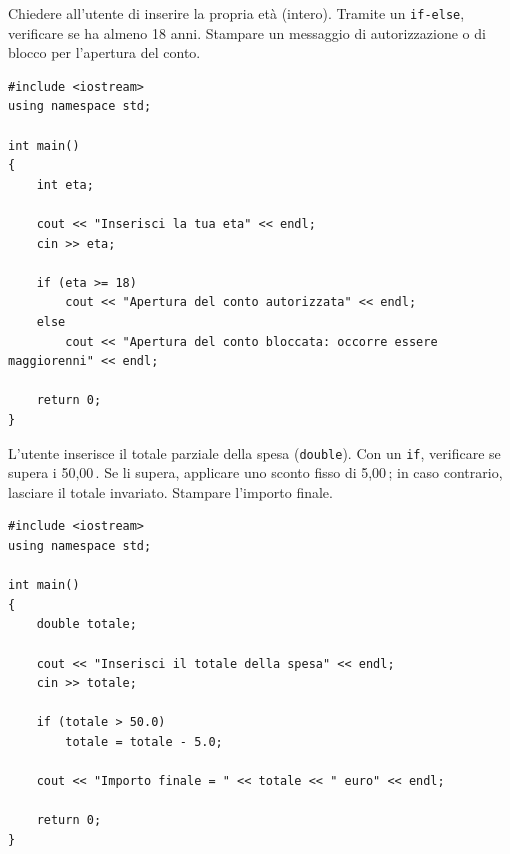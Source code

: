 \documentclass[11pt,fleqn]{book}
\begin{document}
\begin{esercizio}[1]
    Chiedere all'utente di inserire la propria età (intero). Tramite un \texttt{if-else}, verificare se ha almeno 18 anni. Stampare un messaggio di autorizzazione o di blocco per l'apertura del conto.
    \ifsoluzioni
    \solution
    \begin{lstlisting}[style=cpp]
#include <iostream>
using namespace std;

int main()
{
    int eta;

    cout << "Inserisci la tua eta" << endl;
    cin >> eta;

    if (eta >= 18)
        cout << "Apertura del conto autorizzata" << endl;
    else
        cout << "Apertura del conto bloccata: occorre essere maggiorenni" << endl;

    return 0;
}
    \end{lstlisting}
    \fi
\end{esercizio}

\begin{esercizio}[1]
    L'utente inserisce il totale parziale della spesa (\texttt{double}). Con un \texttt{if}, verificare se supera i 50,00\,\texteuro. Se li supera, applicare uno sconto fisso di 5,00\,\texteuro; in caso contrario, lasciare il totale invariato. Stampare l'importo finale.
    \ifsoluzioni
    \solution
    \begin{lstlisting}[style=cpp]
#include <iostream>
using namespace std;

int main()
{
    double totale;

    cout << "Inserisci il totale della spesa" << endl;
    cin >> totale;

    if (totale > 50.0)
        totale = totale - 5.0;

    cout << "Importo finale = " << totale << " euro" << endl;

    return 0;
}
    \end{lstlisting}
    \fi
\end{esercizio}
\end{document}
